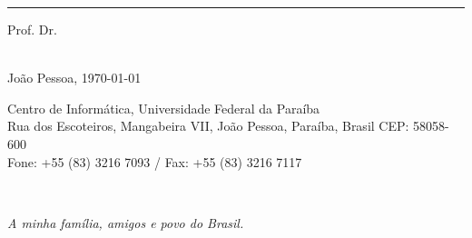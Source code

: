 \documentclass{tcc}
\begin{document}
\vspace{0.25in}

\hrule
\noindent Prof. Dr. \profc\\
\instc\\

\vspace{0.8in}


\vfill

\begin{center}
João Pessoa, \today
\end{center}

\vspace{0.05in}

\begin{center}
\footnotesize{ Centro de Informática, Universidade Federal da Paraíba\\
Rua dos Escoteiros, Mangabeira VII, João Pessoa, Paraíba, Brasil CEP: 58058-600\\
Fone: +55 (83) 3216 7093 / Fax: +55 (83) 3216 7117}
\end{center}
\afterpage{ \addtocounter{page}{1}}
\newpage
$ $
\vfill

\begin{flushright}
\em A minha família, amigos e povo do Brasil.
\end{flushright}



\afterpage{ \addtocounter{page}{1}}

\newpage

% 




\newpage


\newpage



\newpage

\renewcommand{\listfigurename}{\centering LISTA DE FIGURAS}
\listoffigures
\newpage

\renewcommand{\listtablename}{\centering LISTA DE TABELAS}
\listoftables
\newpage
\end{document}
